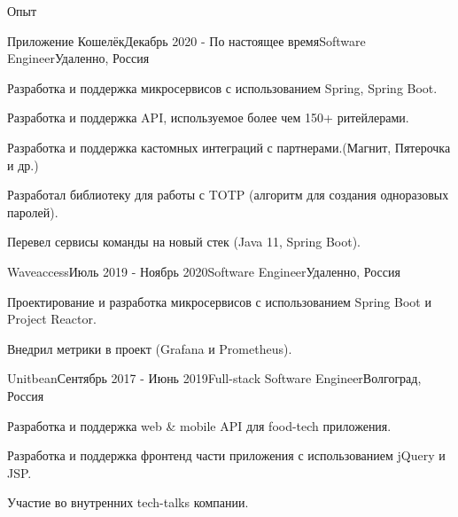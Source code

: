 \documentclass{resume} %
\begin{document}
\begin{rSection}{Опыт}

\begin{rSubsection}{Приложение Кошелёк}{Декабрь 2020 - По настоящее время}{Software Engineer}{Удаленно, Россия}
\item Разработка и поддержка микросервисов с использованием Spring, Spring Boot.
\item Разработка и поддержка API, используемое более чем 150+ ритейлерами.
\item Разработка и поддержка кастомных интеграций с партнерами.(Магнит, Пятерочка и др.)
\item Разработал библиотеку для работы с TOTP (алгоритм для создания одноразовых паролей).
\item Перевел сервисы команды на новый стек (Java 11, Spring Boot).
\end{rSubsection}


\begin{rSubsection}{Waveaccess}{Июль 2019 - Ноябрь 2020}{Software Engineer}{Удаленно, Россия}
\item Проектирование и разработка микросервисов с использованием Spring Boot и Project Reactor.
\item Внедрил метрики в проект (Grafana и Prometheus).
\end{rSubsection}


\begin{rSubsection}{Unitbean}{Сентябрь 2017 - Июнь 2019}{Full-stack Software Engineer}{Волгоград, Россия}
\item Разработка и поддержка web \& mobile API для food-tech приложения.
\item Разработка и поддержка фронтенд части приложения с использованием jQuery и JSP.
\item Участие во внутренних tech-talks компании.
\end{rSubsection}

\end{rSection}





\end{document}
